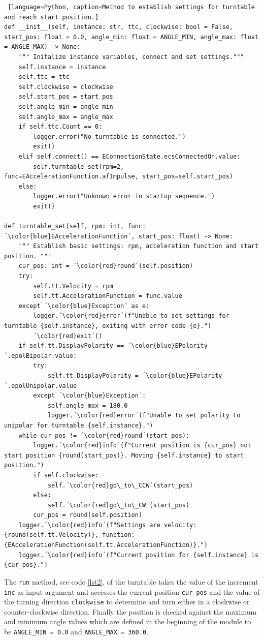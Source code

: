 \begin{lstlisting} [language=Python, caption=Method to establish settings for turntable and reach start position.]
def __init__(self, instance: str, ttc, clockwise: bool = False, start_pos: float = 0.0, angle_min: float = ANGLE_MIN, angle_max: float = ANGLE_MAX) -> None:
    """ Initalize instance variables, connect and set settings."""
    self.instance = instance
    self.ttc = ttc
    self.clockwise = clockwise
    self.start_pos = start_pos
    self.angle_min = angle_min
    self.angle_max = angle_max
    if self.ttc.Count == 0:
        logger.error("No turntable is connected.")
        exit()
    elif self.connect() == EConnectionState.ecsConnectedOn.value:
        self.turntable_set(rpm=2, func=EAccelerationFunction.afImpulse, start_pos=self.start_pos)
    else:
        logger.error("Unknown error in startup sequence.")
        exit()

def turntable_set(self, rpm: int, func: ´\color{blue}EAccelerationFunction´, start_pos: float) -> None:
    """ Establish basic settings: rpm, acceleration function and start position. """
    cur_pos: int = ´\color{red}round´(self.position)
    try:
        self.tt.Velocity = rpm
        self.tt.AccelerationFunction = func.value
    except ´\color{blue}Exception´ as e:
        logger.´\color{red}error´(f"Unable to set settings for turntable {self.instance}, exiting with error code {e}.")
        ´\color{red}exit´()
    if self.tt.DisplayPolarity == ´\color{blue}EPolarity´.epolBipolar.value:
        try:
            self.tt.DisplayPolarity = ´\color{blue}EPolarity´.epolUnipolar.value
        except ´\color{blue}Exception´:
            self.angle_max = 180.0
            logger.´\color{red}error´(f"Unable to set polarity to unipolar for turntable {self.instance}.")
    while cur_pos != ´\color{red}round´(start_pos):
        logger.´\color{red}info´(f"Current position is {cur_pos} not start position {round(start_pos)}. Moving {self.instance} to start position.")
        if self.clockwise:
            self.´\color{red}go\_to\_CCW´(start_pos)
        else:
            self.´\color{red}go\_to\_CW´(start_pos)
        cur_pos = round(self.position)
    logger.´\color{red}info´(f"Settings are velocity: {round(self.tt.Velocity)}, function: {EAccelerationFunction(self.tt.AccelerationFunction)}.")
    logger.´\color{red}info´(f"Current position for {self.instance} is {cur_pos}.")
\end{lstlisting} \label{lst1}

The \verb+run+ method, see code \ref{lst2}, of the turntable takes the value of the increment \verb+inc+ as input argument and accesses the current position \verb+cur_pos+ and the value of the turning direction \verb+clockwise+ to determine and turn either in a clockwise or counter-clockwise direction. Finally the position is checked against the maximum and minimum angle values which are defined in the beginning of the module to be \verb+ANGLE_MIN = 0.0+ and \verb+ANGLE_MAX = 360.0+.

